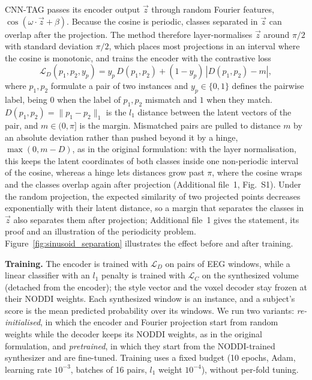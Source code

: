 \documentclass[pdflatex,referee,sn-basic]{sn-jnl}%
\begin{document}
CNN-TAG passes its encoder output $\vec{z}$ through random Fourier features, $\cos(\omega\cdot\vec{z}+\beta)$. Because the cosine is periodic, classes separated in $\vec{z}$ can overlap after the projection. The method therefore layer-normalises \cite{ba2016layer} $\vec{z}$ around $\pi/2$ with standard deviation $\pi/2$, which places most projections in an interval where the cosine is monotonic, and trains the encoder with the contrastive loss
\begin{equation}\label{equation:contrastive}
    \mathcal{L}_D(p_1, p_2, y_p) = y_p\, D(p_1, p_2) + (1-y_p)\, \left| D(p_1,p_2)-m \right|,
\end{equation}
where $p_1, p_2$ formulate a pair of two instances and $y_p \in \{0,1\}$ defines the pairwise label, being $0$ when the label of $p_1, p_2$ mismatch and $1$ when they match. $D(p_1,p_2) = \|p_1-p_2\|_1$ is the $l_1$ distance between the latent vectors of the pair, and $m \in (0, \pi]$ is the margin. Mismatched pairs are pulled to distance $m$ by an absolute deviation rather than pushed beyond it by a hinge, $\max(0, m - D)$, as in the original formulation: with the layer normalisation, this keeps the latent coordinates of both classes inside one non-periodic interval of the cosine, whereas a hinge lets distances grow past $\pi$, where the cosine wraps and the classes overlap again after projection (Additional file~1, Fig.~S1). Under the random projection, the expected similarity of two projected points decreases exponentially with their latent distance, so a margin that separates the classes in $\vec{z}$ also separates them after projection; Additional file~1 gives the statement, its proof and an illustration of the periodicity problem. Figure~\ref{fig:sinusoid_separation} illustrates the effect before and after training.

\noindent\textbf{Training.} The encoder is trained with $\mathcal{L}_D$ on pairs of EEG windows, while a linear classifier with an $l_1$ penalty is trained with $\mathcal{L}_C$ on the synthesized volume (detached from the encoder); the style vector and the voxel decoder stay frozen at their NODDI weights. Each synthesized window is an instance, and a subject's score is the mean predicted probability over its windows. We run two variants: \emph{re-initialised}, in which the encoder and Fourier projection start from random weights while the decoder keeps its NODDI weights, as in the original formulation, and \emph{pretrained}, in which they start from the NODDI-trained synthesizer and are fine-tuned. Training uses a fixed budget (10 epochs, Adam, learning rate $10^{-3}$, batches of 16 pairs, $l_1$ weight $10^{-4}$), without per-fold tuning.
\end{document}
